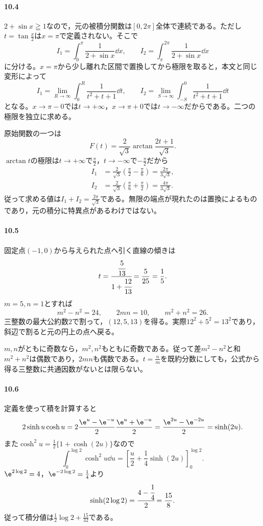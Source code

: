 \paragraph{10.4}
$2+\sin x\geqq1$なので，元の被積分関数は$[0,2\pi]$全体で連続である。ただし$t=\tan\frac x2$は$x=\pi$で定義されない。そこで
\[
I_1=\int_0^\pi\frac1{2+\sin x}\dd x,\qquad
I_2=\int_\pi^{2\pi}\frac1{2+\sin x}\dd x
\]
に分ける。$x=\pi$から少し離れた区間で置換してから極限を取ると，本文と同じ変形によって
\[
I_1=\lim_{R\to\infty}\int_0^R\frac1{t^2+t+1}\dd t,\qquad
I_2=\lim_{S\to\infty}\int_{-S}^0\frac1{t^2+t+1}\dd t
\]
となる。$x\to\pi-0$では$t\to+\infty$，$x\to\pi+0$では$t\to-\infty$だからである。二つの極限を独立に求める。

原始関数の一つは
\[
F(t)=\frac2{\sqrt3}\arctan\frac{2t+1}{\sqrt3}.
\]
$\arctan t$の極限は$t\to+\infty$で$\frac\pi2$，$t\to-\infty$で$-\frac\pi2$だから
\[
\begin{aligned}
I_1&=\frac2{\sqrt3}\left(\frac\pi2-\frac\pi6\right)
=\frac{2\pi}{3\sqrt3},\\
I_2&=\frac2{\sqrt3}\left(\frac\pi6+\frac\pi2\right)
=\frac{4\pi}{3\sqrt3}.
\end{aligned}
\]
従って求める値は$I_1+I_2=\frac{2\pi}{\sqrt3}$である。無限の端点が現れたのは置換によるものであり，元の積分に特異点があるわけではない。

\paragraph{10.5}
固定点$(-1,0)$から与えられた点へ引く直線の傾きは
\[
t=\cfrac{\cfrac5{13}}{1+\cfrac{12}{13}}
=\frac5{25}=\frac15.
\]
$m=5,n=1$とすれば
\[
m^2-n^2=24,\qquad2mn=10,\qquad m^2+n^2=26.
\]
三整数の最大公約数$2$で割って，$(12,5,13)$を得る。実際$12^2+5^2=13^2$であり，斜辺で割ると元の円上の点へ戻る。

$m,n$がともに奇数なら，$m^2,n^2$もともに奇数である。従って差$m^2-n^2$と和$m^2+n^2$は偶数であり，$2mn$も偶数である。$t=\frac nm$を既約分数にしても，公式から得る三整数に共通因数がないとは限らない。

\paragraph{10.6}
定義を使って積を計算すると
\[
2\sinh u\cosh u
=2\frac{\e^u-\e^{-u}}2\frac{\e^u+\e^{-u}}2
=\frac{\e^{2u}-\e^{-2u}}2
=\sinh(2u).
\]
また$\cosh^2u=\frac12\{1+\cosh(2u)\}$なので
\[
\int_0^{\log2}\cosh^2u\dd u
=\left[\frac u2+\frac14\sinh(2u)\right]_0^{\log2}.
\]
$\e^{2\log2}=4$，$\e^{-2\log2}=\frac14$より
\[
\sinh(2\log2)=\cfrac{4-\cfrac14}{2}=\frac{15}{8}.
\]
従って積分値は$\frac12\log2+\frac{15}{32}$である。

